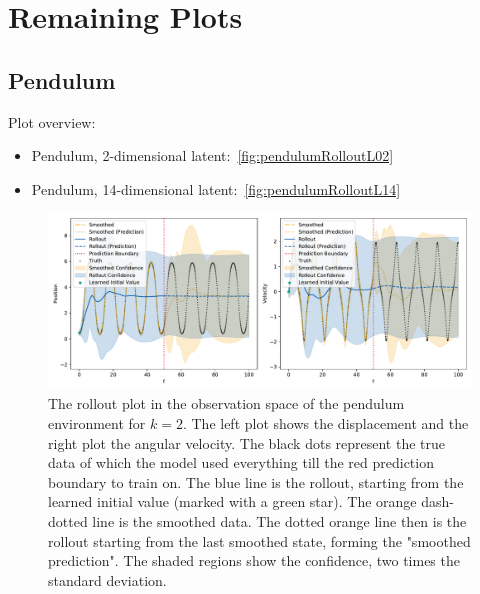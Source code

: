 \section{Remaining Plots}
	\label{app:remainingPlots}

	\subsection{Pendulum}
		Plot overview:
		\begin{itemize}
			\item Pendulum, 2-dimensional latent:~\autoref{fig:pendulumRolloutL02}
			\item Pendulum, 14-dimensional latent:~\autoref{fig:pendulumRolloutL14}
		\end{itemize}

		\begin{figure}
			\centering
			\includegraphics[width=\linewidth]{figures/results/pendulum/run-latent-dim-02/rollout-observations-N0.pdf}
			\caption[Rollout of the pendulum experiment for 2 latent dimensions]{The rollout plot in the observation space of the pendulum environment for \(k = 2\). The left plot shows the displacement and the right plot the angular velocity. The black dots represent the true data of which the model used everything till the red prediction boundary to train on. The blue line is the rollout, starting from the learned initial value (marked with a green star). The orange dash-dotted line is the smoothed data. The dotted orange line then is the rollout starting from the last smoothed state, forming the "smoothed prediction". The shaded regions show the confidence, \ie two times the standard deviation.}
			\label{fig:pendulumRolloutL02}
		\end{figure}

